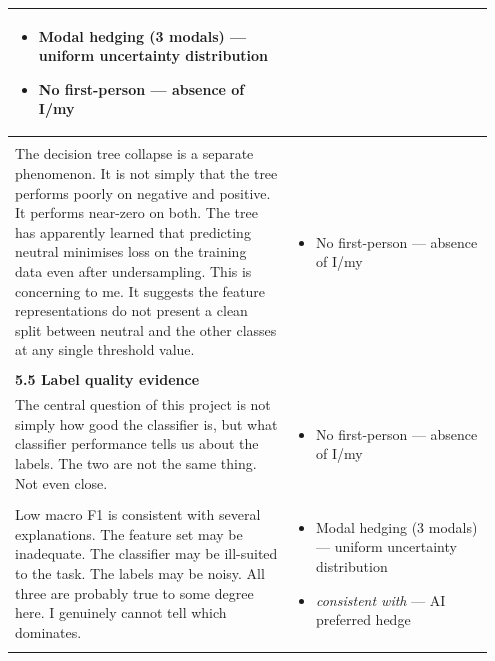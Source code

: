 \documentclass[11pt]{article}
\begin{document}
\begin{longtable}{|p{0.55\linewidth}|p{0.40\linewidth}|}
\begin{itemize}[leftmargin=1em,itemsep=1pt,topsep=1pt,parsep=0pt]
  \item Modal hedging (3 modals) --- uniform uncertainty distribution
  \item No first-person --- absence of I/my
\end{itemize} \\[2pt]
\hline
\rule[-3.5cm]{0pt}{3.5cm} & \\
\hline
The decision tree collapse is a separate phenomenon. It is not simply that the tree performs poorly on negative and positive. It performs near-zero on both. The tree has apparently learned that predicting neutral minimises loss on the training data even after undersampling. This is concerning to me. It suggests the feature representations do not present a clean split between neutral and the other classes at any single threshold value. & \begin{itemize}[leftmargin=1em,itemsep=1pt,topsep=1pt,parsep=0pt]
  \item No first-person --- absence of I/my
\end{itemize} \\[2pt]
\hline
\rule[-3.5cm]{0pt}{3.5cm} & \\
\hline
\textbf{5.5 Label quality evidence}\\[4pt]
The central question of this project is not simply how good the classifier is, but what classifier performance tells us about the labels. The two are not the same thing. Not even close. & \begin{itemize}[leftmargin=1em,itemsep=1pt,topsep=1pt,parsep=0pt]
  \item No first-person --- absence of I/my
\end{itemize} \\[2pt]
\hline
\rule[-3.5cm]{0pt}{3.5cm} & \\
\hline
Low macro F1 is consistent with several explanations. The feature set may be inadequate. The classifier may be ill-suited to the task. The labels may be noisy. All three are probably true to some degree here. I genuinely cannot tell which dominates. & \begin{itemize}[leftmargin=1em,itemsep=1pt,topsep=1pt,parsep=0pt]
  \item Modal hedging (3 modals) --- uniform uncertainty distribution
  \item \textit{consistent with} --- AI preferred hedge
\end{itemize} \\[2pt]
\hline
\rule[-3.5cm]{0pt}{3.5cm} & \\
\hline

\end{longtable}
\end{document}
